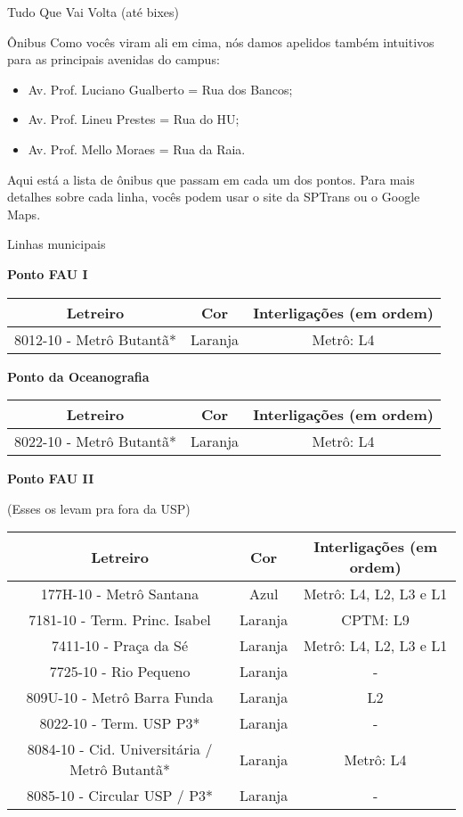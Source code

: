 \begin{secao}{Tudo Que Vai Volta (até bixes)}
\begin{subsecao}{Ônibus}
Como vocês viram ali em cima, nós damos apelidos também intuitivos para as
principais avenidas do campus:
\begin{itemize}
	\item Av. Prof. Luciano Gualberto = Rua dos Bancos;
	\item Av. Prof. Lineu Prestes = Rua do HU;
	\item Av. Prof. Mello Moraes = Rua da Raia.
\end{itemize}

Aqui está a lista de ônibus que passam em cada um dos pontos. Para mais detalhes
sobre cada linha, vocês podem usar o site da SPTrans ou o Google Maps.

\begin{subsubsecao}{Linhas municipais}

{\bf Ponto FAU I}

\begin{center}
	\begin{tabular}{|c|c|c|}
      \hline
	  Letreiro & Cor & Interligações (em ordem)\\
	  \hline
	  8012-10 - Metrô Butantã* & Laranja & Metrô: L4\\
      \hline
	\end{tabular}
\end{center}

{\bf Ponto da Oceanografia}

\begin{center}
	\begin{tabular}{|c|c|c|}
      \hline
	  Letreiro & Cor & Interligações (em ordem)\\
	  \hline
	  8022-10 - Metrô Butantã* & Laranja & Metrô: L4\\
      \hline
	\end{tabular}
\end{center}

{\bf Ponto FAU II}

(Esses os levam pra fora da USP)
\begin{center}
	\begin{tabular}{|c|c|c|}
      \hline
	  Letreiro & Cor & Interligações (em ordem)\\
	  \hline
	  177H-10 - Metrô Santana & Azul & Metrô: L4, L2, L3 e L1\\
	  7181-10 - Term. Princ. Isabel & Laranja & CPTM: L9\\
	  7411-10 - Praça da Sé & Laranja & Metrô: L4, L2, L3 e L1\\
	  7725-10 - Rio Pequeno & Laranja & - \\
	  809U-10 - Metrô Barra Funda & Laranja & L2 \\
	  8022-10 - Term. USP P3* & Laranja & -\\
   	  8084-10 - Cid. Universitária / Metrô Butantã* & Laranja & Metrô: L4\\
      	  8085-10 - Circular USP / P3* & Laranja & -\\
      \hline
	\end{tabular}
\end{center}


\end{subsubsecao}
\end{subsecao}
\end{secao}
